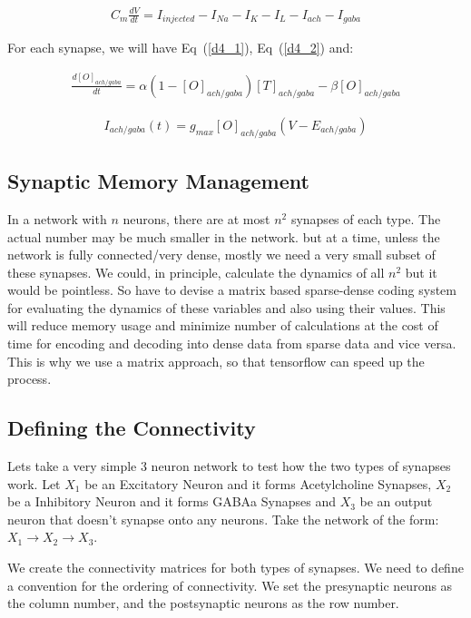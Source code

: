 \documentclass[10pt,letterpaper]{article}
\begin{document}
\begin{eqnarray}C_m\frac{dV}{dt} = I_{injected} - I_{Na} - I_K - I_L - I_{ach} - I_{gaba}\end{eqnarray}

For each synapse, we will have Eq~(\ref{d4_1}), Eq~(\ref{d4_2}) and:

\begin{eqnarray}\frac{d[O]_{ach/gaba}}{dt} = \alpha (1-[O]_{ach/gaba})[T]_{ach/gaba}-\beta[O]_{ach/gaba}\end{eqnarray}

\begin{eqnarray}I_{ach/gaba}(t)=g_{max}[O]_{ach/gaba}(V−E_{ach/gaba})\end{eqnarray}

\subsection*{Synaptic Memory Management}

In a network with $n$ neurons, there are at most $n^2$ synapses of each type. The actual number may be much smaller in the network. but at a time, unless the network is fully connected/very dense, mostly we need a very small subset of these synapses. We could, in principle, calculate the dynamics of all $n^2$ but it would be pointless. So have to devise a matrix based sparse-dense coding system for evaluating the dynamics of these variables and also using their values. This will reduce memory usage and minimize number of calculations at the cost of time for encoding and decoding into dense data from sparse data and vice versa. This is why we use a matrix approach, so that tensorflow can speed up the process. 

\subsection*{Defining the Connectivity}

Lets take a very simple 3 neuron network to test how the two types of synapses work. Let $X_1$ be an Excitatory Neuron and it forms Acetylcholine Synapses, $X_2$ be a Inhibitory Neuron and it forms GABAa Synapses and $X_3$ be an output neuron that doesn't synapse onto any neurons. Take the network of the form: $X_1\rightarrow X_2\rightarrow X_3$. 

We create the connectivity matrices for both types of synapses. We need to define a convention for the ordering of connectivity. We set the presynaptic neurons as the column number, and the postsynaptic neurons as the row number.  
\end{document}
